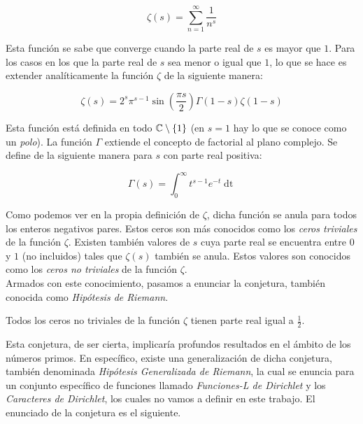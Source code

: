 \begin{equation}\label{funcion_zeta_de_riemann}
\zeta(s) = \sum_{n=1}^{\infty}\frac{1}{n^s}
\end{equation}

Esta función se sabe que converge cuando la parte real de $s$ es mayor que $1$. Para los casos en los que la parte real de $s$ sea menor o igual que $1$, lo que se hace es extender analíticamente la función $\zeta$ de la siguiente manera:

\begin{equation}\label{funcion_zeta_de_riemann_extendida}
\zeta(s) = 2^s\pi^{s-1}\sin\left(\frac{\pi s}{2}\right)\Gamma(1-s)\zeta(1-s)
\end{equation}

Esta función está definida en todo $\mathbb{C} \setminus \{1\}$ (en $s = 1$ hay lo que se conoce como un \textit{polo}). La función $\Gamma$ extiende el concepto de factorial al plano complejo. Se define de la siguiente manera para $s$ con parte real positiva:

\begin{equation}
\Gamma(s) = \int_{0}^{\infty}t^{s-1}e^{-t}\mathop{dt}
\end{equation}

Como podemos ver en la propia definición de $\zeta$, dicha función se anula para todos los enteros negativos pares. Estos ceros son más conocidos como los \textit{ceros triviales} de la función $\zeta$. Existen también valores de $s$ cuya parte real se encuentra entre $0$ y $1$ (no incluidos) tales que $\zeta(s)$ también se anula. Estos valores son conocidos como los \textit{ceros no triviales} de la función $\zeta$.\\

Armados con este conocimiento, pasamos a enunciar la conjetura, también conocida como \textit{Hipótesis de Riemann}.

\begin{conjetura}\label{hipotesis_de_riemann}
	Todos los ceros no triviales de la función $\zeta$ tienen parte real igual a $\frac{1}{2}$.
\end{conjetura}

Esta conjetura, de ser cierta, implicaría profundos resultados en el ámbito de los números primos. En específico, existe una generalización de dicha conjetura, también denominada \textit{Hipótesis Generalizada de Riemann}, la cual se enuncia para un conjunto específico de funciones llamado \textit{Funciones-L de Dirichlet} y los \textit{Caracteres de Dirichlet}, los cuales no vamos a definir en este trabajo. El enunciado de la conjetura es el siguiente.

